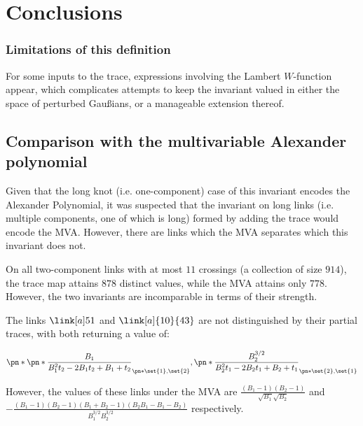 \chapter{Conclusions}\label{ch:conclusions}

\subsection{Limitations of this definition}\label{sec:limitations}
For some inputs to the trace, expressions involving the Lambert $W$-function
appear, which complicates attempts to keep the invariant valued in either the
space of perturbed Gaußians, or a manageable extension thereof.

\section{Comparison with the multivariable Alexander polynomial}
\label{sec:compare_MVA}

Given that the long knot (i.e. one-component) case of this invariant
encodes the Alexander Polynomial, it was suspected that the invariant on long
links (i.e. multiple components, one of which is long) formed by adding the
trace would encode the \ac{MVA}. However, there are links which the \ac{MVA}
separates which this invariant does not.

On all two-component links with at most $11$ crossings (a collection of size
$914$), the trace map attains $878$ distinct values, while the MVA attains only
$778$. However, the two invariants are incomparable in terms of their strength.

The links $\link[a]51$ and $\link[a]{10}{43}$ are not distinguished by their
partial traces, with both returning a value of:

\begin{equation}
        \pn*{
                \pn*{
                        \frac{B_1}{B_1^2 t_2 -2 B_1 t_2 +B_1+t_2}
                }_{\pn*{\set{1},\set{2}}},
                \pn*{
                        \frac{B_2^{3/2}}{B_2^2 t_1 -2 B_2 t_1 +B_2+t_1}
                }_{\pn*{\set{2},\set{1}}}
}
\end{equation}

However, the values of these links under the \ac{MVA} are
$\frac{\left(B_1-1\right) \left(B_2-1\right)}{\sqrt{B_1} \sqrt{B_2}}
$ and $-\frac{\left(B_1-1\right) \left(B_2-1\right) \left(B_1+B_2-1\right)
        \left(B_2 B_1-B_1-B_2\right)}{B_1^{3/2} B_2^{3/2}}$ respectively.

